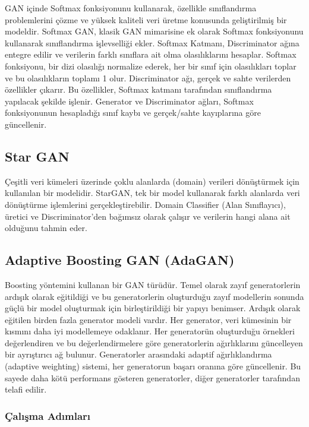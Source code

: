 GAN içinde Softmax fonksiyonunu kullanarak, özellikle sınıflandırma problemlerini çözme ve yüksek kaliteli veri üretme konusunda geliştirilmiş bir modeldir. Softmax GAN, klasik GAN mimarisine ek olarak Softmax fonksiyonunu kullanarak sınıflandırma işlevselliği ekler. Softmax Katmanı, Discriminator ağına entegre edilir ve verilerin farklı sınıflara ait olma olasılıklarını hesaplar. Softmax fonksiyonu, bir dizi olasılığı normalize ederek, her bir sınıf için olasılıkları toplar ve bu olasılıkların toplamı 1 olur. Discriminator ağı, gerçek ve sahte verilerden özellikler çıkarır. Bu özellikler, Softmax katmanı tarafından sınıflandırma yapılacak şekilde işlenir. Generator ve Discriminator ağları, Softmax fonksiyonunun hesapladığı sınıf kaybı ve gerçek/sahte kayıplarına göre güncellenir.

\subsection{Star GAN}

Çeşitli veri kümeleri üzerinde çoklu alanlarda (domain) verileri dönüştürmek için kullanılan bir modelidir. StarGAN, tek bir model kullanarak farklı alanlarda veri dönüştürme işlemlerini gerçekleştirebilir. Domain Classifier (Alan Sınıflayıcı), üretici ve Discriminator'den bağımsız olarak çalışır ve verilerin hangi alana ait olduğunu tahmin eder. 

\subsection{Adaptive Boosting GAN (AdaGAN)}

Boosting yöntemini kullanan bir GAN türüdür. Temel olarak zayıf generatorlerin ardışık olarak eğitildiği ve bu generatorlerin oluşturduğu zayıf modellerin sonunda güçlü bir model oluşturmak için birleştirildiği bir yapıyı benimser. Ardışık olarak eğitilen birden fazla generator modeli vardır. Her generator, veri kümesinin bir kısmını daha iyi modellemeye odaklanır. Her generatorün oluşturduğu örnekleri değerlendiren ve bu değerlendirmelere göre generatorlerin ağırlıklarını güncelleyen bir ayrıştırıcı ağ bulunur. Generatorler arasındaki adaptif ağırlıklandırma (adaptive weighting) sistemi, her generatorun başarı oranına göre güncellenir. Bu sayede daha kötü performans gösteren generatorler, diğer generatorler tarafından telafi edilir. 

\subsubsection{Çalışma Adımları}

